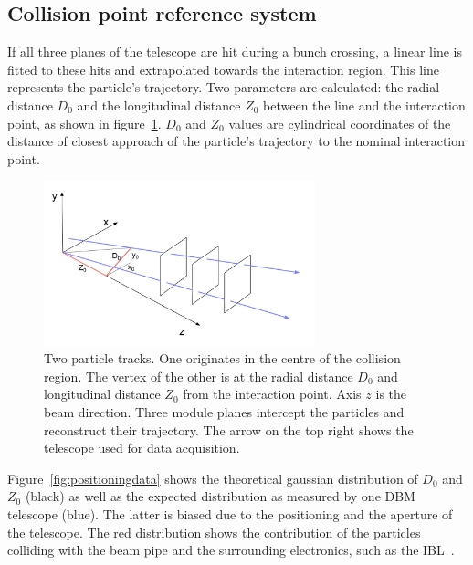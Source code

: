 \subsection{Collision point reference system}
If all three planes of the telescope are hit during a bunch crossing, a linear line is fitted to these hits and extrapolated towards the interaction region. This line represents the particle's trajectory. Two parameters are calculated: the radial distance $D_\mathrm{0}$ and the longitudinal distance $Z_\mathrm{0}$ between the line and the interaction point, as shown in figure~\ref{fig:z-r-distance}. $D_\mathrm{0}$ and $Z_\mathrm{0}$ values are cylindrical coordinates of the distance of closest approach  of the particle's trajectory to the nominal interaction point.
\begin{figure}[!t]
\centering
\includegraphics[width=0.7\textwidth]{../scripts/04_charge_monitoring/plots/z-r-distance2}
\caption{Two particle tracks. One originates in the centre of the collision region. The vertex of the other is at the radial distance $D_\mathrm{0}$ and longitudinal distance $Z_\mathrm{0}$ from the interaction point. Axis $z$ is the beam direction. Three module planes intercept the particles and reconstruct their trajectory. The arrow on the top right shows the telescope used for data acquisition.}
\label{fig:z-r-distance}
\end{figure}
Figure~\ref{fig:positioningdata} shows the theoretical gaussian distribution of $D_\mathrm{0}$ and $Z_\mathrm{0}$ (black) as well as the expected distribution as measured by one DBM telescope (blue). The latter is biased due to the positioning and the aperture of the telescope. The red distribution shows the contribution of the particles colliding with the beam pipe and the surrounding electronics, such as the IBL~\cite{Capeans:1291633}.



